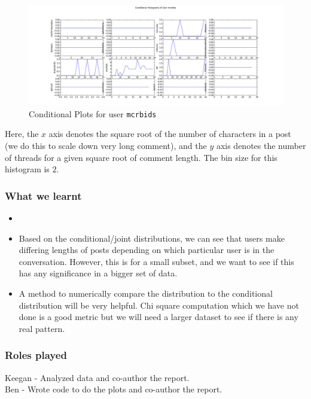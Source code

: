 \documentclass[a4paper,12pt]{article}
\numberwithin{equation}{section}
\begin{document}
\begin{figure}[here!]
\begin{center}
\includegraphics[angle = 90, scale=0.46]{mcrbids.png}
\caption{Conditional Plots for user {\tt mcrbids}}
\end{center}
\end{figure}

Here, the $x$ axis denotes the square root of the number of characters in a post (we do this to scale down very long comment), and the $y$ axis denotes the number of threads for a given square root of comment length. The bin size for this histogram is $2$.


\subsubsection*{What we learnt}


\begin{itemize}
\item 
\item Based on the conditional/joint distributions, we can see that users make differing lengths of posts depending on which particular user is in the conversation. However, this is for a small subset, and we want to see if this has any significance in a bigger set of data. 
\item A method to numerically compare the distribution to the conditional distribution will be very helpful. Chi square computation which we have not done is a good metric but we will need a larger dataset to see if there is any real pattern. 
\end{itemize}



\subsubsection*{Roles played}

Keegan - Analyzed data and co-author the report.  \\
Ben - Wrote code to do the plots and co-author the report.

\clearpage

	
\end{document}
